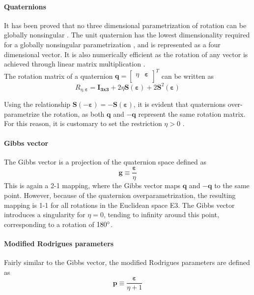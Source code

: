     \paragraph{Quaternions} 
    It has been proved that no three dimensional parametrization of rotation can be globally nonsingular \cite{stuelpnagel1964parametrization}. The unit quaternion has the lowest dimensionality required for a globally nonsingular parametrization \cite{markley2003attitude}, and is represented as a four dimensional vector. It is also numerically efficient as the rotation of any vector is achieved through linear matrix multiplication . \\
    
    The rotation matrix of a quaternion $ \boldsymbol{q} = \begin{bmatrix} \eta & \bm{\varepsilon}\\ \end{bmatrix}^T$ can be written as \cite{fossen2011handbook}
    \begin{equation}
        \label{eq:quatRotMat}
        R_{\eta,\bm{\varepsilon}} = \bm{I_{3x3}} + 2\eta\bm{S}(\bm{\varepsilon}) + 2\bm{S}^2(\bm{\varepsilon})
    \end{equation}

    Using the relationship $\bm{S}(-\bm{\varepsilon}) = -\bm{S(\bm{\varepsilon})}$, it is evident that quaternions over-parametrize the rotation, as both $\bm{q}$ and $\bm{-q}$ represent the same rotation matrix. For this reason, it is customary to set the restriction $\eta > 0$ \cite{markley2003attitude}.

    \paragraph{Gibbs vector}
    The Gibbs vector is a projection of the quaternion space defined as
    \begin{equation}
        \label{eq:gibbs}
        \bm{g} \equiv \frac{\bm{\varepsilon}}{\eta}
    \end{equation}
    This is again a 2-1 mapping, where the Gibbs vector maps $\bm{q}$ and $\bm{-q}$ to the same point. However, because of the quaternion overparametrization, the resulting mapping is 1-1 for all rotations in the Euclidean space E3. The Gibbs vector introduces a singularity for $\eta = 0$, tending to infinity around this point, corresponding to a rotation of $180\degree$.

    \paragraph{Modified Rodrigues parameters}
    Fairly similar to the Gibbs vector, the modified Rodrigues parameters are defined as
    \begin{equation}
        \label{eq:modRodrigues}
        \bm{p} \equiv \frac{\bm{\varepsilon}}{\eta + 1}
    \end{equation}





